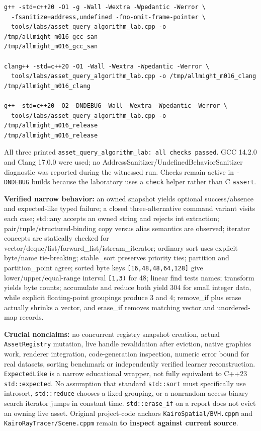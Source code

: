 \begin{verbatim}
g++ -std=c++20 -O1 -g -Wall -Wextra -Wpedantic -Werror \
  -fsanitize=address,undefined -fno-omit-frame-pointer \
  tools/labs/asset_query_algorithm_lab.cpp -o /tmp/allmight_m016_gcc_san
/tmp/allmight_m016_gcc_san

clang++ -std=c++20 -O1 -Wall -Wextra -Wpedantic -Werror \
  tools/labs/asset_query_algorithm_lab.cpp -o /tmp/allmight_m016_clang
/tmp/allmight_m016_clang

g++ -std=c++20 -O2 -DNDEBUG -Wall -Wextra -Wpedantic -Werror \
  tools/labs/asset_query_algorithm_lab.cpp -o /tmp/allmight_m016_release
/tmp/allmight_m016_release
\end{verbatim}

All three printed \texttt{asset\_query\_algorithm\_lab:\ all\ checks\ passed}. GCC 14.2.0 and Clang 17.0.0 were used; no AddressSanitizer/UndefinedBehaviorSanitizer diagnostic was reported during the witnessed run. Checks remain active in \texttt{-DNDEBUG} builds because the laboratory uses a \texttt{check} helper rather than C \texttt{assert}.

\textbf{Verified narrow behavior:} an owned snapshot yields optional success/absence and expected-like typed failure; a closed three-alternative command variant visits each case; std::any accepts an owned string and rejects int extraction; pair/tuple/structured-binding copy versus alias semantics are observed; iterator concepts are statically checked for vector/deque/list/forward\_list/istream\_iterator; ordinary sort uses explicit byte/name tie-breaking; stable\_sort preserves priority ties; partition and partition\_point agree; sorted byte keys \texttt{{[}16,48,48,64,128{]}} give lower/upper/equal-range interval \texttt{{[}1,3)} for 48; linear find tests names; transform yields byte counts; accumulate and reduce both yield 304 for small integer data, while explicit floating-point groupings produce 3 and 4; remove\_if plus erase actually shrinks a vector, and erase\_if removes matching vector and unordered-map records.

\textbf{Crucial nonclaims:} no concurrent registry snapshot creation, actual \texttt{AssetRegistry} mutation, live handle revalidation after eviction, native graphics work, renderer integration, code-generation inspection, numeric error bound for real datasets, sorting benchmark or independently verified learner reconstruction. \texttt{ExpectedLike} is a narrow educational wrapper, not fully equivalent to C++23 \texttt{std::expected}. No assumption that standard \texttt{std::sort} must specifically use introsort, \texttt{std::reduce} chooses a fixed grouping, or a nonrandom-access binary-search iterator jumps in constant time. \texttt{std::erase\_if} on a report does not evict an owning live asset. Original project-code anchors \texttt{KairoSpatial/BVH.cppm} and \texttt{KairoRayTracer/Scene.cppm} remain \textbf{to inspect against current source}.

